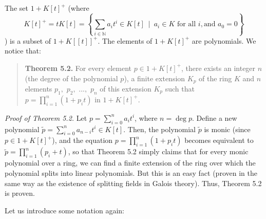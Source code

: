 \documentclass[12pt,final,notitlepage,onecolumn,german]{article}%
\begin{document}
The set $1+K\left[  t\right]  ^{+}$ (where%
\[
K\left[  t\right]  ^{+}=tK\left[  t\right]  =\left\{  \sum_{i\in\mathbb{N}%
}a_{i}t^{i}\in K\left[  t\right]  \ \mid\ a_{i}\in K\text{ for all }i,\text{
and }a_{0}=0\right\}
\]
) is a subset of $1+K\left[  \left[  t\right]  \right]  ^{+}.$ The elements of
$1+K\left[  t\right]  ^{+}$ are polynomials. We notice that:

\begin{quote}
\textbf{Theorem 5.2.} For every element $p\in1+K\left[  t\right]  ^{+}$, there
exists an integer $n$ (the degree of the polynomial $p$), a finite extension
$K_{p}$ of the ring $K$ and $n$ elements $p_{1},$ $p_{2},$ $...,$ $p_{n}$ of
this extension $K_{p}$ such that $p=\prod\limits_{i=1}^{n}\left(
1+p_{i}t\right)  $ in $1+K\left[  t\right]  ^{+}.$
\end{quote}

\textit{Proof of Theorem 5.2.} Let $p=\sum\limits_{i=0}^{n}a_{i}t^{i}$, where
$n=\deg p$. Define a new polynomial $\widetilde{p}=\sum\limits_{i=0}%
^{n}a_{n-i}t^{i}\in K\left[  t\right]  $. Then, the polynomial $\widetilde{p}$
is monic (since $p\in1+K\left[  t\right]  ^{+}$), and the equation
$p=\prod\limits_{i=1}^{n}\left(  1+p_{i}t\right)  $ becomes equivalent to
$\widetilde{p}=\prod\limits_{i=1}^{n}\left(  p_{i}+t\right)  $, so that
Theorem 5.2 simply claims that for every monic polynomial over a ring, we can
find a finite extension of the ring over which the polynomial splits into
linear polynomials. But this is an easy fact (proven in the same way as the
existence of splitting fields in Galois theory). Thus, Theorem 5.2 is proven.

Let us introduce some notation again:
\end{document}
